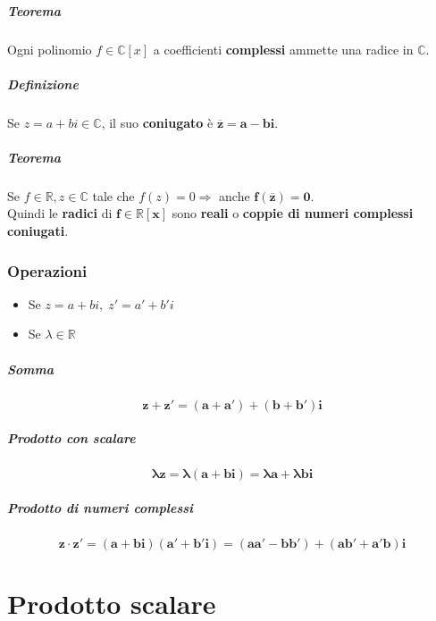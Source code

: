 \documentclass[a4paper, 12pt]{report}
\begin{document}
                \paragraph{Teorema}Ogni polinomio $f \in \mathbb{C}[x]$ a coefficienti \textbf{complessi} ammette una radice in $\mathbb{C}$.
                \paragraph{Definizione} Se $z=a+bi \in \mathbb{C}$, il suo \textbf{coniugato} è $\boldsymbol{\overline{z}=a-bi}$.
                \paragraph{Teorema}Se $f \in \mathbb{R}, z \in \mathbb{C}$ tale che $f(z)=0 \Rightarrow$ anche $\boldsymbol{f(\overline{z})=0}$.\\
                Quindi le \textbf{radici} di $\boldsymbol{f \in \mathbb{R}[x]}$ sono \textbf{reali} o \textbf{coppie di numeri complessi coniugati}.
                \subsection{Operazioni}
                \begin{itemize}
                    \item Se $z=a+bi, \; z'=a'+b'i$
                    \item Se $\lambda \in \mathbb{R}$
                \end{itemize}
                \paragraph{Somma}         
                $$\boldsymbol{z+z'=(a+a')+(b+b')i}$$                
                \paragraph{Prodotto con scalare}
                $$\boldsymbol{\lambda z=\lambda(a+bi)=\lambda a+\lambda bi}$$
                \paragraph{Prodotto di numeri complessi}
                $$\boldsymbol{z \cdot z'=(a+bi)(a'+b'i)=(aa'-bb')+(ab'+a'b)i}$$
        \chapter{Prodotto scalare}
\end{document}
